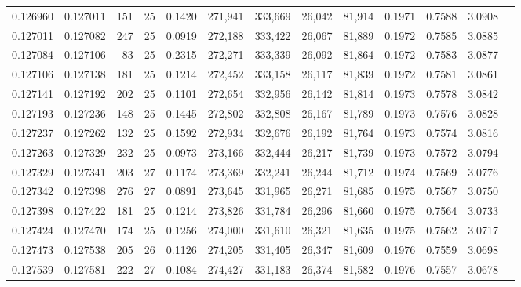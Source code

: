 \begin{tabular}{rrrrrrrrrrrrr}
0.126960 & 0.127011 & 151 &  25 &                                     0.1420 & 271,941 & 333,669 &  26,042 &  81,914 & 0.1971 & 0.7588 & 3.0908 \\
0.127011 & 0.127082 & 247 &  25 &                                     0.0919 & 272,188 & 333,422 &  26,067 &  81,889 & 0.1972 & 0.7585 & 3.0885 \\
0.127084 & 0.127106 &  83 &  25 &                                     0.2315 & 272,271 & 333,339 &  26,092 &  81,864 & 0.1972 & 0.7583 & 3.0877 \\
0.127106 & 0.127138 & 181 &  25 &                                     0.1214 & 272,452 & 333,158 &  26,117 &  81,839 & 0.1972 & 0.7581 & 3.0861 \\
0.127141 & 0.127192 & 202 &  25 &                                     0.1101 & 272,654 & 332,956 &  26,142 &  81,814 & 0.1973 & 0.7578 & 3.0842 \\
0.127193 & 0.127236 & 148 &  25 &                                     0.1445 & 272,802 & 332,808 &  26,167 &  81,789 & 0.1973 & 0.7576 & 3.0828 \\
0.127237 & 0.127262 & 132 &  25 &                                     0.1592 & 272,934 & 332,676 &  26,192 &  81,764 & 0.1973 & 0.7574 & 3.0816 \\
0.127263 & 0.127329 & 232 &  25 &                                     0.0973 & 273,166 & 332,444 &  26,217 &  81,739 & 0.1973 & 0.7572 & 3.0794 \\
0.127329 & 0.127341 & 203 &  27 &                                     0.1174 & 273,369 & 332,241 &  26,244 &  81,712 & 0.1974 & 0.7569 & 3.0776 \\
0.127342 & 0.127398 & 276 &  27 &                                     0.0891 & 273,645 & 331,965 &  26,271 &  81,685 & 0.1975 & 0.7567 & 3.0750 \\
0.127398 & 0.127422 & 181 &  25 &                                     0.1214 & 273,826 & 331,784 &  26,296 &  81,660 & 0.1975 & 0.7564 & 3.0733 \\
0.127424 & 0.127470 & 174 &  25 &                                     0.1256 & 274,000 & 331,610 &  26,321 &  81,635 & 0.1975 & 0.7562 & 3.0717 \\
0.127473 & 0.127538 & 205 &  26 &                                     0.1126 & 274,205 & 331,405 &  26,347 &  81,609 & 0.1976 & 0.7559 & 3.0698 \\
0.127539 & 0.127581 & 222 &  27 &                                     0.1084 & 274,427 & 331,183 &  26,374 &  81,582 & 0.1976 & 0.7557 & 3.0678 \\

\end{tabular}
